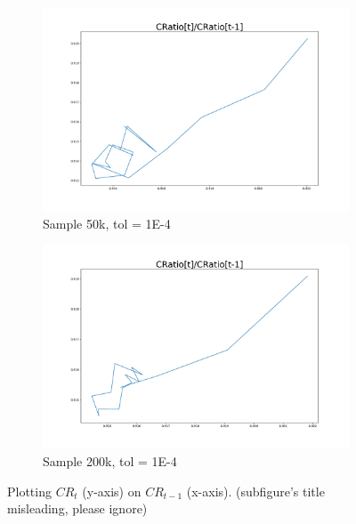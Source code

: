 \documentclass[]{article}
\begin{document}
\begin{figure}
\begin{subfigure}[b]{0.45\textwidth}
		\includegraphics[width=1.2\textwidth]{../50kSample_BaseCal_TolE-4/CRatio.pdf}
		\caption{Sample 50k, tol = 1E-4}
		\label{fig:Cratio-50k}
	\end{subfigure}
	\hfill
	\begin{subfigure}[b]{0.45\textwidth}
		\centering
		\includegraphics[width=1.2\textwidth]{../200kSample_BaseCal_TolE-4/CRatio.pdf}
		\caption{Sample 200k, tol = 1E-4}
		\label{fig:Cratio-200k}
	\end{subfigure}
	\caption{Plotting $CR_t$ (y-axis) on $CR_{t-1}$ (x-axis). (subfigure's title misleading, please ignore)}
	\label{fig:CRatio}
\end{figure}


\newpage
\end{document}
